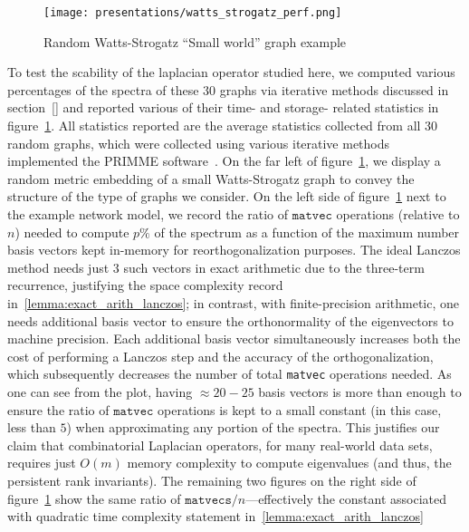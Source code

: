 \documentclass[10pt]{article}
\numberwithin{equation}{section}
\newcommand{\+}{%
	\raisebox{0.18ex}{\scaleobj{0.55}{+}}
}
\theoremstyle{definition}
\theoremstyle{definition}
\begin{document}
\begin{figure}[t]
	\texttt{[image: presentations/watts\_strogatz\_perf.png]}
	\caption{Random Watts-Strogatz ``Small world'' graph example}
	\label{fig:watts_strogatz}
\end{figure}
To test the scability of the laplacian operator studied here, we computed various percentages of the spectra of these $30$ graphs via iterative methods discussed in section~\ref{} and reported various of their time- and storage- related statistics in figure~\ref{fig:watts_strogatz}. 
All statistics reported are the average statistics collected from all 30 random graphs, which were collected using  various iterative methods implemented the PRIMME software~\cite{}. 
On the far left of figure~\ref{fig:watts_strogatz}, we display a random metric embedding of a small Watts-Strogatz graph to convey the structure of the type of graphs we consider. 
On the left side of figure~\ref{fig:watts_strogatz} next to the example network model, we record the ratio of $\mathtt{matvec}$ operations (relative to $n$) needed to compute $p\%$ of the spectrum as a function of the maximum number basis vectors kept in-memory for reorthogonalization purposes. 
The ideal Lanczos method needs just $3$ such vectors in exact arithmetic due to the three-term recurrence, justifying the space complexity record in~\ref{lemma:exact_arith_lanczos}; in contrast, with finite-precision arithmetic, one needs additional basis vector to ensure the orthonormality of the eigenvectors to machine precision.
Each additional basis vector simultaneously increases both the cost of performing a Lanczos step and the accuracy of the orthogonalization, which subsequently decreases the number of total \texttt{matvec} operations needed. 
As one can see from the plot, having $\approx 20-25$ basis vectors is more than enough to ensure the ratio of $\mathtt{matvec}$ operations is kept to a small constant (in this case, less than $5$) when approximating any portion of the spectra. 
This justifies our claim that combinatorial Laplacian operators, for many real-world data sets, requires just $O(m)$ memory complexity to compute eigenvalues (and thus, the persistent rank invariants).
 The remaining two figures on the right side of figure~\ref{fig:watts_strogatz} show the same ratio of $\mathtt{matvecs}/n$---effectively the constant associated with quadratic time complexity statement in~\ref{lemma:exact_arith_lanczos}


\end{document}
